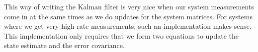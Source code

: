 

This way of writing the Kalman filter is very nice when our system measurements come in at the same times as we do updates for the system matrices. For systems where we get very high rate measurements, such an implementation makes sense. This implementation only requires that we form two equations to update the state estimate and the error covariance.

